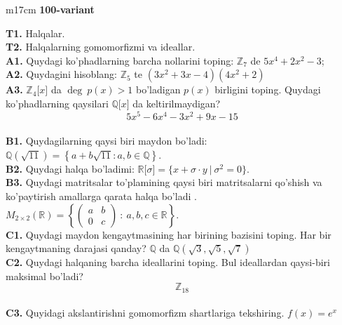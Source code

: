 \documentclass{article}
\begin{document}
\begin{tabular}{m{17cm}}
\textbf{100-variant}
\newline

\textbf{T1.} Halqalar. \\
\textbf{T2.} Halqalarning gomomorfizmi va ideallar. \\
\textbf{A1.} Quydagi ko'phadlarning barcha nollarini toping:
\(\mathbb{Z}_{7}\) de \(5x^{4} + 2x^{2} - 3\); \\
\textbf{A2.} Quydagini hisoblang:
\(\mathbb{Z}_{5}\) te \(\left( 3x^{2} + 3x - 4 \right)\left( 4x^{2} + 2 \right)\) \\
\textbf{A3.} \(\mathbb{Z}_{4}\lbrack x\rbrack\) da \(\deg\ p(x) > 1\) bo'ladigan \(p(x)\) birligini toping. Quydagi ko'phadlarning qaysilari \(\mathbb{Q\lbrack}x\rbrack\) da keltirilmaydigan?
\[5x^{5} - 6x^{4} - 3x^{2} + 9x - 15\] \\
\textbf{B1.} Quydagilarning qaysi biri maydon bo'ladi:
\(\mathbb{Q}\left( \sqrt{11} \right) = \left\{ a + b\sqrt{11}:a,b \in \mathbb{Q} \right\}\). \\
\textbf{B2.} Quydagi halqa bo'ladimi:
\(\mathbb{R\lbrack}\sigma\rbrack = \{ x + \sigma \cdot y\ |\ \sigma^{2} = 0\}\). \\
\textbf{B3.} Quydagi matritsalar to'plamining qaysi biri matritsalarni qo'shish va ko'paytirish amallarga qarata halqa bo'ladi .
\(M_{2 \times 2}\mathbb{(R) =}\left\{ \begin{pmatrix}
a & b \\
0 & c
\end{pmatrix}\ :\ a,b,c \in \mathbb{R} \right\}\). \\
\textbf{C1.} Quydagi maydon kengaytmasining har birining bazisini toping. Har bir kengaytmaning darajasi qanday?
\(\mathbb{Q}\) da \(\mathbb{Q}\left( \sqrt{3},\sqrt{5},\sqrt{7} \right)\) \\
\textbf{C2.} Quydagi halqaning barcha ideallarini toping. Bul ideallardan qaysi-biri maksimal bo'ladi?
\[\mathbb{Z}_{18}\] \\
\textbf{C3.} Quyidagi akslantirishni gomomorfizm shartlariga tekshiring. \(f(x) = e^{x}\) \\

\end{tabular}
\vspace{1cm}
\end{document}

